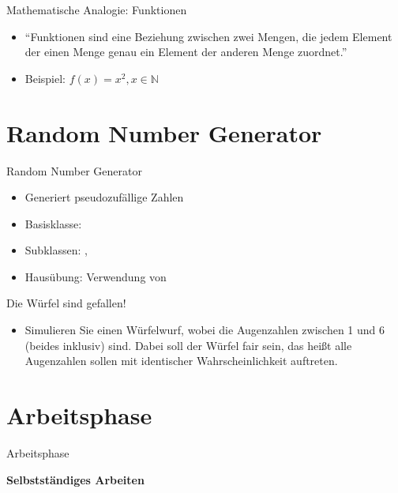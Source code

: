 \documentclass{../tuda-beamer}
\begin{document}
  \begin{frame}{Mathematische Analogie: Funktionen}
    \begin{itemize}
      \item \enquote{Funktionen sind eine Beziehung zwischen zwei Mengen, die jedem Element der
      einen Menge genau ein Element der anderen Menge zuordnet.}
      \item Beispiel: \(f(x) = x^2, x \in \mathbb{N}\)

      
    \end{itemize}
  \end{frame}


  \section{Random Number Generator}
  \begin{frame}{Random Number Generator}
    \begin{itemize}
      \item Generiert pseudozufällige Zahlen
      \item Basisklasse: 
      \item Subklassen: , 
      \item Hausübung: Verwendung von 
    \end{itemize}
  \end{frame}

  \begin{frame}{Die Würfel sind gefallen!}
    \begin{itemize}
      \item Simulieren Sie einen Würfelwurf, wobei die Augenzahlen zwischen 1 und 6 (beides
      inklusiv) sind. Dabei soll der Würfel fair sein, das heißt alle Augenzahlen sollen mit
      identischer Wahrscheinlichkeit auftreten.
    \end{itemize}

    
  \end{frame}


  \section{Arbeitsphase}
  \begin{frame}[c]{Arbeitsphase}
    \begin{center}
      \textbf{\LARGE Selbstständiges Arbeiten}
    \end{center}
  \end{frame}
\end{document}
